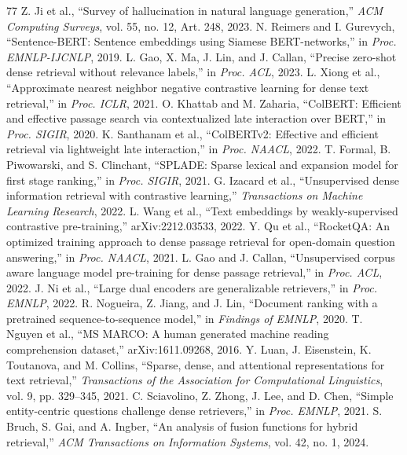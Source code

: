 \documentclass[conference]{IEEEtran}
\begin{document}
\begin{thebibliography}{77}
 Z. Ji et al., ``Survey of hallucination in natural language generation,'' \emph{ACM Computing Surveys}, vol. 55, no. 12, Art. 248, 2023.
 N. Reimers and I. Gurevych, ``Sentence-BERT: Sentence embeddings using Siamese BERT-networks,'' in \emph{Proc. EMNLP-IJCNLP}, 2019.
 L. Gao, X. Ma, J. Lin, and J. Callan, ``Precise zero-shot dense retrieval without relevance labels,'' in \emph{Proc. ACL}, 2023.
 L. Xiong et al., ``Approximate nearest neighbor negative contrastive learning for dense text retrieval,'' in \emph{Proc. ICLR}, 2021.
 O. Khattab and M. Zaharia, ``ColBERT: Efficient and effective passage search via contextualized late interaction over BERT,'' in \emph{Proc. SIGIR}, 2020.
 K. Santhanam et al., ``ColBERTv2: Effective and efficient retrieval via lightweight late interaction,'' in \emph{Proc. NAACL}, 2022.
 T. Formal, B. Piwowarski, and S. Clinchant, ``SPLADE: Sparse lexical and expansion model for first stage ranking,'' in \emph{Proc. SIGIR}, 2021.
 G. Izacard et al., ``Unsupervised dense information retrieval with contrastive learning,'' \emph{Transactions on Machine Learning Research}, 2022.
 L. Wang et al., ``Text embeddings by weakly-supervised contrastive pre-training,'' arXiv:2212.03533, 2022.
 Y. Qu et al., ``RocketQA: An optimized training approach to dense passage retrieval for open-domain question answering,'' in \emph{Proc. NAACL}, 2021.
 L. Gao and J. Callan, ``Unsupervised corpus aware language model pre-training for dense passage retrieval,'' in \emph{Proc. ACL}, 2022.
 J. Ni et al., ``Large dual encoders are generalizable retrievers,'' in \emph{Proc. EMNLP}, 2022.
 R. Nogueira, Z. Jiang, and J. Lin, ``Document ranking with a pretrained sequence-to-sequence model,'' in \emph{Findings of EMNLP}, 2020.
 T. Nguyen et al., ``MS MARCO: A human generated machine reading comprehension dataset,'' arXiv:1611.09268, 2016.
 Y. Luan, J. Eisenstein, K. Toutanova, and M. Collins, ``Sparse, dense, and attentional representations for text retrieval,'' \emph{Transactions of the Association for Computational Linguistics}, vol. 9, pp. 329--345, 2021.
 C. Sciavolino, Z. Zhong, J. Lee, and D. Chen, ``Simple entity-centric questions challenge dense retrievers,'' in \emph{Proc. EMNLP}, 2021.
 S. Bruch, S. Gai, and A. Ingber, ``An analysis of fusion functions for hybrid retrieval,'' \emph{ACM Transactions on Information Systems}, vol. 42, no. 1, 2024.

\end{thebibliography}
\end{document}

